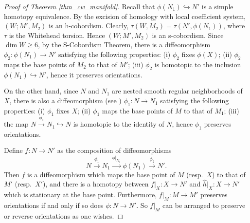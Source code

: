 \documentclass[12pt]{amsart}
\theoremstyle{plain}
\theoremstyle{definition}
\theoremstyle{question}
\theoremstyle{remark}
\theoremstyle{assumption}
\numberwithin{equation}{section}
\theoremstyle{bigthm}
\begin{document}
\begin{proof}[Proof of Theorem \ref{thm_cw_manifold}]
Recall that $\phi (N_{1}) \hookrightarrow N'$ is a simple homotopy equivalence. By the excision of homology with local coefficient system, $(W; M', M_{2})$ is an h-cobordism. Clearly, $\tau (W, M_{2}) = \tau (N', \phi (N_{1}))$, where $\tau$ is the Whitehead torsion. Hence $(W; M', M_{2})$ is an s-cobordism. Since $\dim W \ge 6$, by the S-Cobordism Theorem, there is a diffeomorphism $\phi_{2} \colon  \phi (N_{1}) \rightarrow N'$ satisfying the following properties: (i) $\phi_{2}$ fixes $\phi (X)$; (ii) $\phi_{2}$ maps the base points of $M_{2}$ to that of $M'$; (iii) $\phi_{2}$ is homotopic to the inclusion $\phi (N_{1}) \hookrightarrow N'$, hence it preserves orientations.

On the other hand, since $N$ and $N_{1}$ are nested smooth regular neighborhoods of $X$, there is also a diffeomorphism (see \cite[Theorem~1]{Hirsch}) $\phi_{1} \colon  N \rightarrow N_{1}$ satisfying the following properties: (i) $\phi_{1}$ fixes $X$; (ii) $\phi_{1}$ maps the base points of $M$ to that of $M_{1}$; (iii) the map $N \overset{\phi_{1}}{\rightarrow} N_{1} \hookrightarrow N$ is homotopic to the identity of $N$, hence $\phi_{1}$ preserves orientations.

Define $f \colon  N \rightarrow N'$ as the composition of diffeomorphisms
\[
N \overset{\phi_{1}}{\rightarrow} N_{1} \overset{\phi|_{N_{1}}}{\rightarrow} \phi (N_{1}) \overset{\phi_{2}}{\rightarrow} N'.
\]
Then $f$ is a diffeomorphism which maps the base point of $M$ (resp.~$X$) to that of $M'$ (resp.~$X'$), and there is a homotopy between $f|_{X} \colon  X \rightarrow N'$ and $\hat{h}|_{X} \colon  X \rightarrow N'$ which is stationary at the base point. Furthermore, $f|_{M} \colon  M \rightarrow M'$ preserves orientations if and only if so does $\phi \colon  N \rightarrow N'$. So $f|_{M}$ can be arranged to preserve or reverse orientations as one wishes.


\end{proof}
\end{document}
